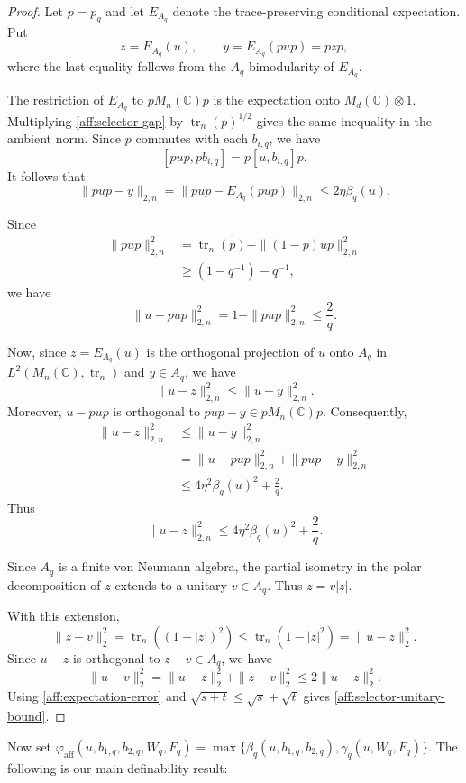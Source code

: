 \documentclass[12pt]{amsart}
\numberwithin{equation}{section}
\theoremstyle{definition}
\newcommand{\C}{\mathbb{C}}
\DeclareMathOperator{\tr}{tr}
\begin{document}
\begin{proof}
Let $p=p_q$ and let $E_{A_q}$ denote the
trace-preserving conditional expectation.
Put
\[
z=E_{A_q}(u),
\qquad
y=E_{A_q}(pup)=pzp,
\]
where the last equality follows from the
$A_q$-bimodularity of $E_{A_q}$.

The restriction of $E_{A_q}$ to $pM_n(\C)p$
is the expectation onto $M_d(\C)\otimes1$.
Multiplying \eqref{aff:selector-gap} by
$\tr_{n}(p)^{1/2}$ gives the same inequality
in the ambient norm.
Since $p$ commutes with each $b_{i,q}$,
we have
\[
[pup,pb_{i,q}]=p[u,b_{i,q}]p.
\]
It follows that
\[
\|pup-y\|_{2,n}
=\|pup-E_{A_q}(pup)\|_{2,n}
\le 2\eta\beta_q(u).
\]

Since
\[
\begin{aligned}
\|pup\|_{2,n}^2
&=\tr_{n}(p)-\|(1-p)up\|_{2,n}^2\\
&\ge (1-q^{-1})-q^{-1},
\end{aligned}
\]
we have
\[
\|u-pup\|_{2,n}^2
=1-\|pup\|_{2,n}^2
\le\frac2q.
\]

Now, since $z=E_{A_q}(u)$ is the
orthogonal projection of $u$ onto $A_q$
in $L^2(M_n(\C),\tr_{{n}})$ and $y\in A_q$,
we have
\[
\|u-z\|_{2,n}^2\le\|u-y\|_{2,n}^2.
\]
Moreover, $u-pup$ is orthogonal to
$pup-y\in pM_n(\C)p$. Consequently,
\[
\begin{aligned}
\|u-z\|_{2,n}^2
&\le\|u-y\|_{2,n}^2\\
&=\|u-pup\|_{2,n}^2
  +\|pup-y\|_{2,n}^2\\
&\le4\eta^2\beta_q(u)^2+\frac2q.
\end{aligned}
\]
Thus
\begin{equation}
\label{aff:expectation-error}
\|u-z\|_{2,n}^2
\le4\eta^2\beta_q(u)^2+\frac2q.
\end{equation}

Since $A_q$ is a finite von Neumann algebra,
the partial isometry in the polar decomposition
of $z$ extends to a unitary $v\in A_q$.
Thus $z=v|z|$.

With this extension,
\[
 \|z-v\|_2^2
 =\tr_{n}((1-|z|)^2)
 \le\tr_{n}(1-|z|^2)=\|u-z\|_2^2.
\]
Since $u-z$ is orthogonal to $z-v\in A_q$, we have
\[
 \|u-v\|_2^2
 =\|u-z\|_2^2+\|z-v\|_2^2
 \le2\|u-z\|_2^2.
\]
Using \eqref{aff:expectation-error} and
$\sqrt{s+t}\le\sqrt s+\sqrt t$ gives
\eqref{aff:selector-unitary-bound}.
\end{proof}

Now set $\varphi_{\operatorname{aff}}(u,b_{1,q},b_{2,q},W_q,F_q)=\max\{\beta_q(u,b_{1,q},b_{2,q}),\gamma_q(u,W_q,F_q)\}$.  The following is our main definability result:
\end{document}
